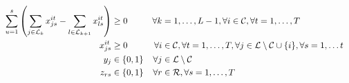 \begin{alignat}{3}
    &&\sum_{u=1}^s \left(\sum_{j\in\mathcal{L}_{k}} x^{it}_{js} - \sum_{l\in\mathcal{L}_{k+1}} x^{it}_{ls}\right) &\geq 0\quad 			&\forall k&=1,\ldots,L-1, \forall i\in\mathcal{C}, \forall t=1,\ldots,T \label{const:invflowdepots2}\\
    &&x^{it}_{js}			&\geq 0 															&\forall i&\in \mathcal{C},\forall t=1,\ldots, T, \forall j\in \mathcal{L}\setminus\mathcal{C}\cup\{i\}, \forall s= 1,\ldots t\label{const:upos2}	\\
    &&y_{j}					& \in \{0,1\} 														&\forall j&\in \mathcal{L}\setminus\mathcal{C}\label{const:ybool2}\\	
    &&z_{rs}					&\in \{0,1\} 														&\forall r&\in \mathcal{R}, \forall s=1,\ldots,T\label{const:zbool2}
\end{alignat}

